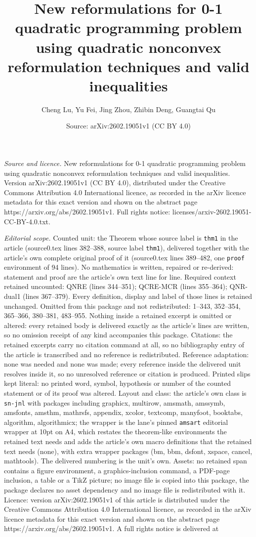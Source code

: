 \documentclass[10pt,a4paper]{amsart}
\title[New reformulations for 0-1 quadratic programming problem usi]{New reformulations for 0-1 quadratic programming problem using quadratic nonconvex reformulation techniques and valid inequalities}
\author{Cheng Lu, Yu Fei, Jing Zhou, Zhibin Deng, Guangtai Qu}
\date{Source: arXiv:2602.19051v1 (CC BY 4.0)}
\begin{document}
\maketitle

\noindent\emph{Source and licence.} New reformulations for 0-1 quadratic programming problem using quadratic nonconvex reformulation techniques and valid inequalities. Version arXiv:2602.19051v1 (CC BY 4.0), distributed under the Creative Commons Attribution 4.0 International licence, as recorded in the arXiv licence metadata for this exact version and shown on the abstract page https://arxiv.org/abs/2602.19051v1. Full rights notice: licenses/arxiv-2602.19051-CC-BY-4.0.txt.\par\smallskip

\noindent\textit{Editorial scope.} Counted unit: the Theorem whose source label is \texttt{thm1} in the article (source0.tex lines 382--388, source label \texttt{thm1}), delivered together with the article's own complete original proof of it (source0.tex lines 389--482, one \texttt{proof} environment of 94 lines). No mathematics is written, repaired or re-derived: statement and proof are the article's own text line for line. Required context retained uncounted: QNRE (lines 344--351); QCRE-MCR (lines 355--364); QNR-dual1 (lines 367--379). Every definition, display and label of those lines is retained unchanged. Omitted from this package and not redistributed: 1--343, 352--354, 365--366, 380--381, 483--955. Nothing inside a retained excerpt is omitted or altered: every retained body is delivered exactly as the article's lines are written, so no omission receipt of any kind accompanies this package. Citations: the retained excerpts carry no citation command at all, so no bibliography entry of the article is transcribed and no reference is redistributed. Reference adaptation: none was needed and none was made; every reference inside the delivered unit resolves inside it, so no unresolved reference or citation is produced. Printed slips kept literal: no printed word, symbol, hypothesis or number of the counted statement or of its proof was altered. Layout and class: the article's own class is \texttt{sn-jnl} with packages including graphicx, multirow, amsmath, amssymb, amsfonts, amsthm, mathrsfs, appendix, xcolor, textcomp, manyfoot, booktabs, algorithm, algorithmicx; the wrapper is the lane's pinned \texttt{amsart} editorial wrapper at 10pt on A4, which restates the theorem-like environments the retained text needs and adds the article's own macro definitions that the retained text needs (none), with extra wrapper packages (bm, bbm, dsfont, xspace, cancel, mathtools). The delivered numbering is the unit's own. Assets: no retained span contains a figure environment, a graphics-inclusion command, a PDF-page inclusion, a table or a TikZ picture; no image file is copied into this package, the package declares no asset dependency and no image file is redistributed with it. Licence: version arXiv:2602.19051v1 of this article is distributed under the Creative Commons Attribution 4.0 International licence, as recorded in the arXiv licence metadata for this exact version and shown on the abstract page https://arxiv.org/abs/2602.19051v1. A full rights notice is delivered at 
\end{document}
